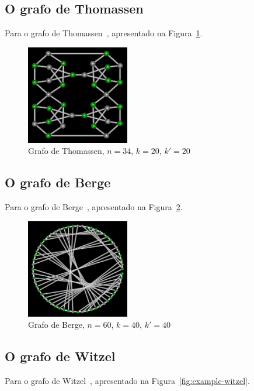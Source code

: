 \subsection{O grafo de Thomassen}
Para o grafo de Thomassen~\cite{cite:example-thomassen},
apresentado na Figura~\ref{fig:example-thomassen}.

\begin{figure}[htb]
\centering
\includegraphics[width=0.4\textwidth]{img/thomassen.png}
\caption{Grafo de Thomassen, $n=34$, $k=20$, $k'=20$}
\label{fig:example-thomassen}
\end{figure}


\subsection{O grafo de Berge}
Para o grafo de Berge~\cite{cite:example-berge},
apresentado na Figura~\ref{fig:example-berge}.

\begin{figure}[htb]
\centering
\includegraphics[width=0.4\textwidth]{img/berge.png}
\caption{Grafo de Berge, $n=60$, $k=40$, $k'=40$}
\label{fig:example-berge}
\end{figure}


\subsection{O grafo de Witzel}
Para o grafo de Witzel~\cite{cite:example-witzel},
apresentado na Figura~\ref{fig:example-witzel}.

